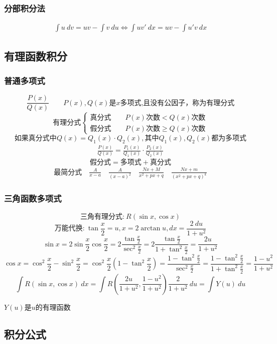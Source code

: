 \subsubsection{分部积分法}
\begin{align}
    \int u\ dv=uv-\int v\ du\Leftrightarrow\int u v'\ dx=uv-\int u'v\ dx
\end{align}
\subsection{有理函数积分}
\subsubsection{普通多项式}
    $$\frac{P(x)}{Q(x)}\qquad P(x),Q(x)\mbox{是$x$多项式,且没有公因子，称为有理分式}$$
    $$\mbox{有理分式}\begin{cases}
        \mbox{真分式}\qquad P(x)\mbox{次数}<Q(x)\mbox{次数}\\
        \mbox{假分式}\qquad P(x)\mbox{次数}\geqslant Q(x)\mbox{次数}
    \end{cases}$$
    $$\mbox{如果真分式中}Q(x)=Q_1(x)\cdot Q_2(x),\mbox{其中}Q_1(x),Q_2(x)\mbox{都为多项式}$$
\begin{align}
    \frac{P(x)}{Q(x)}=\frac{P_1(x)}{Q_1(x)}\cdot\frac{P_2(x)}{Q_2(x)}
\end{align}
$$\mbox{假分式}=\mbox{多项式}+\mbox{真分式}$$
\begin{align*}
    \mbox{最简分式}\quad\frac{A}{x-a}\quad\frac{A}{(x-a)^2}\quad\frac{Nx+M}{x^2+px+q}\quad\frac{Nx+m}{(x^2+px+q)^k}
\end{align*}
\subsubsection{三角函数多项式}
$$\mbox{三角有理分式:}\ R(\sin x,\cos x)$$
$$\mbox{万能代换:}\ \tan\frac{x}{2}=u,x=2\arctan u,dx=\frac{2\ du}{1+u^2}$$
$$\sin x =2\sin \frac{x}{2}\cos \frac{x}{2}=2\frac{\tan \frac{x}{2}}{\sec^2 \frac{x}{2}}=2\frac{\tan \frac{x}{2}}{1+\tan^2 \frac{x}{2}}=\frac{2u}{1+u^2}$$
$$\cos x=\cos^2\frac{x}{2}-\sin^2\frac{x}{2}=\cos^2\frac{x}{2}(1-\tan^2\frac{x}{2})=\frac{1-\tan^2\frac{x}{2}}{\sec^2\frac{x}{2}}=\frac{1-\tan^2\frac{x}{2}}{1+\tan^2\frac{x}{2}}=\frac{1-u^2}{1+u^2}$$
$$\int R(\sin x,\cos x)\ dx=\int R(\frac{2u}{1+u^2},\frac{1-u^2}{1+u^2})\frac{2}{1+u^2}\ du=\int Y(u)\ du$$
\centerline{$Y(u)$是$u$的有理函数}
\subsection{积分公式}
